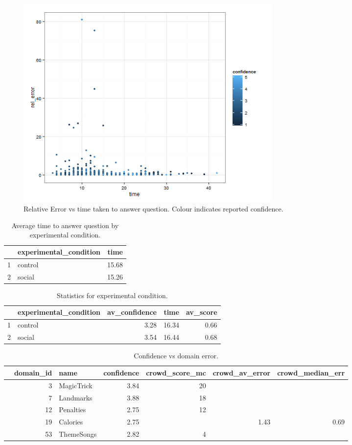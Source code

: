 \documentclass[12pt]{article}
\begin{document}
\begin{figure}[ht!]
\begin{center}
\includegraphics[width=0.65\textwidth]{../../output/demo_analysis/time_rel_error.png}
\caption{Relative Error vs time taken to answer question. Colour indicates reported confidence.}
\end{center}	
\end{figure}


\begin{table}[ht]
\centering
\begin{tabular}{rlr}
  \hline
 & experimental\_condition & time \\ 
  \hline
1 & control & 15.68 \\ 
  2 & social & 15.26 \\ 
   \hline
\end{tabular}
\caption{Average time to answer question by experimental condition.} 
\end{table}

\begin{table}[ht]
\centering
\begin{tabular}{rlrrr}
  \hline
 & experimental\_condition & av\_confidence & time & av\_score \\ 
  \hline
1 & control & 3.28 & 16.34 & 0.66 \\ 
  2 & social & 3.54 & 16.44 & 0.68 \\ 
   \hline
\end{tabular}
\caption{Statistics for experimental condition.} 
\end{table}

\begin{table}[ht]
\centering
\begin{tabular}{rrlrrrr}
  \hline
 & domain\_id & name & confidence & crowd\_score\_mc & crowd\_av\_error & crowd\_median\_err \\ 
  \hline
 &   3 & MagicTrick & 3.84 &  20 &  &  \\ 
 &   7 & Landmarks & 3.88 &  18 &  &  \\ 
 &  12 & Penalties & 2.75 &  12 &  &  \\ 
 &  19 & Calories & 2.75 &   & 1.43 & 0.69 \\ 
 &  53 & ThemeSongs & 2.82 &   4 &  &  \\ 
   \hline
\end{tabular}
\caption{Confidence vs domain error.} 
\end{table}
\end{document}
